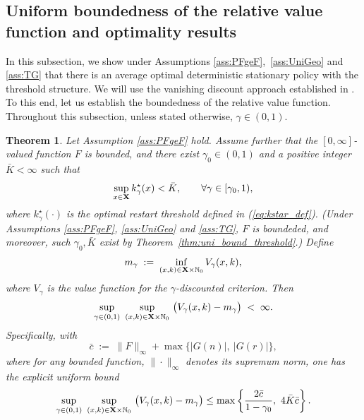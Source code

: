 \documentclass[letterpaper,10pt,conference]{ieeeconf}  %
\newtheorem{theorem}{Theorem}
\newtheorem{remark}{Remark}
\begin{document}

\subsection{Uniform {boundedness} of the relative value {function} and optimality results}

{In this subsection, we show under Assumptions \ref{ass:PFgeF},~\ref{ass:UniGeo} and \ref{ass:TG} that there is an average optimal deterministic stationary policy with the threshold structure. We will use the vanishing discount approach established in \cite{Schal1993}. To this end,}  let us establish the {boundedness} of the relative value function. {Throughout this subsection, unless stated otherwise, $\gamma\in(0,1)$.}
\medskip
\begin{theorem}
\label{thm:bound_relative_value}
Let {Assumption \ref{ass:PFgeF} hold.}
Assume further that {the $[0,\infty]$-valued function $F$ is bounded,} and there exist $\gamma_0\in(0,1)$ and a {positive} integer ${\bar{K}}<\infty$ such that
\begin{equation}
\label{eq:unifK}
\sup_{x\in {\bf X}} k^\star_\gamma(x) <{\bar{K}},
\qquad \forall \gamma\in [\gamma_0,1),
\end{equation}
where $k^\star_\gamma(\cdot)$ is the optimal restart threshold defined in (\ref{eq:kstar_def}). 
(Under {Assumptions \ref{ass:PFgeF}, \ref{ass:UniGeo} and \ref{ass:TG}}, {$F$ is boundeded, and moreover,} such $\gamma_0,{\bar{K}}$ exist by 
Theorem~\ref{thm:uni_bound_threshold}.) Define 
\[
m_\gamma \;:=\; \inf_{(x,k)\in {\bf X}\times\mathbb N_0} V_\gamma(x,k),
\]
{where $V_\gamma$ is the value function for the $\gamma$-discounted criterion}.
Then
\[
\sup_{\gamma\in(0,1)}\ \sup_{(x,k)\in {\bf X}\times \mathbb N_0}\ \bigl(V_\gamma(x,k)-m_\gamma\bigr)
\;<\;\infty.
\]
Specifically, with
\[
\bar c \;:=\; \|F\|_\infty + \max\bigl\{|G(n)|,\ |G(r)|\bigr\},
\]
{where for any bounded function, $\|\cdot\|_\infty$ denotes its supremum norm,}
one has the explicit uniform bound
\begin{equation}
\label{eq:explicit_bound_inf}
\sup_{\gamma\in(0,1)}\ \sup_{(x,k)\in {\bf X}\times \mathbb N_0}\ \bigl(V_\gamma(x,k)-m_\gamma\bigr)
\le
\max\left\{\frac{2\bar c}{1-\gamma_0},\ 4 {\bar{K}} \bar c\right\}.
\end{equation}
\end{theorem}
\end{document}
